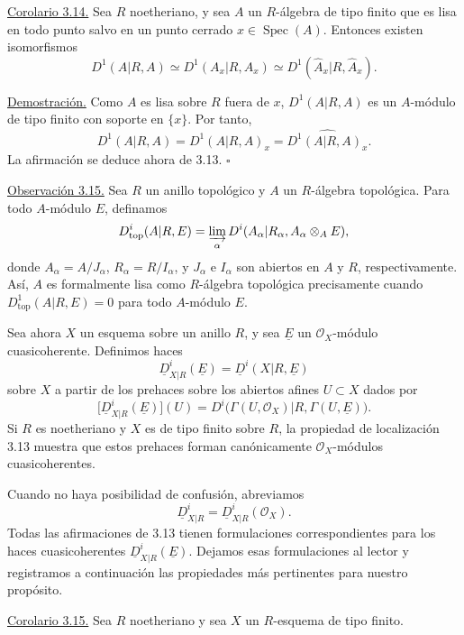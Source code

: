 
\underline{Corolario 3.14.}
Sea $R$ noetheriano, y sea $A$ un $R$-álgebra de tipo finito
que es lisa en todo punto salvo en un punto cerrado
$x\in\operatorname{Spec}(A)$. Entonces existen isomorfismos
\[
 D^1(A|R,A)\simeq D^1(A_x|R,A_x)
 \simeq D^1(\widehat A_x|R,\widehat A_x).
\]

\underline{Demostración.}
Como $A$ es lisa sobre $R$ fuera de $x$,
$D^1(A|R,A)$ es un $A$-módulo de tipo finito con soporte en
$\{x\}$. Por tanto,
\[
 D^1(A|R,A)=D^1(A|R,A)_x
 =\widehat{D^1(A|R,A)_x}.
\]
La afirmación se deduce ahora de 3.13.
\hfill$\square$

\underline{Observación 3.15.}
Sea $R$ un anillo topológico y $A$ un $R$-álgebra topológica.
Para todo $A$-módulo $E$, definamos
\[
 D^i_{\mathrm{top}}(A|R,E)
 =\varinjlim_\alpha
 D^i(A_\alpha|R_\alpha,A_\alpha\otimes_AE),
\]
donde $A_\alpha=A/J_\alpha$, $R_\alpha=R/I_\alpha$, y
$J_\alpha$ e $I_\alpha$ son abiertos en $A$ y $R$, respectivamente.
Así, $A$ es formalmente lisa como $R$-álgebra topológica precisamente
cuando $D^1_{\mathrm{top}}(A|R,E)=0$ para todo $A$-módulo $E$.

Sea ahora $X$ un esquema sobre un anillo $R$, y sea $\underline E$ un
$\mathcal O_X$-módulo cuasicoherente. Definimos haces
\[
 \underline D^i_{X|R}(\underline E)
 =\underline D^i(X|R,\underline E)
\]
sobre $X$ a partir de los prehaces sobre los abiertos afines
$U\subset X$ dados por
\[
 \bigl[\underline D^i_{X|R}(\underline E)\bigr](U)
 =D^i\bigl(\Gamma(U,\mathcal O_X)|R,
            \Gamma(U,\underline E)\bigr).
\]
Si $R$ es noetheriano y $X$ es de tipo finito sobre $R$, la
propiedad de localización 3.13 muestra que estos prehaces forman
canónicamente $\mathcal O_X$-módulos cuasicoherentes.

Cuando no haya posibilidad de confusión, abreviamos
\[
 \underline D^i_{X|R}
 =\underline D^i_{X|R}(\mathcal O_X).
\]
Todas las afirmaciones de 3.13 tienen formulaciones correspondientes
para los haces cuasicoherentes
$\underline D^i_{X|R}(\underline E)$. Dejamos esas formulaciones al
lector y registramos a continuación las propiedades más pertinentes
para nuestro propósito.

\underline{Corolario 3.15.}
Sea $R$ noetheriano y sea $X$ un $R$-esquema de tipo finito.


